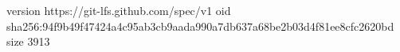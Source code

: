 version https://git-lfs.github.com/spec/v1
oid sha256:94f9b49f47424a4c95ab3cb9aada990a7db637a68be2b03d4f81ee8cfc2620bd
size 3913
